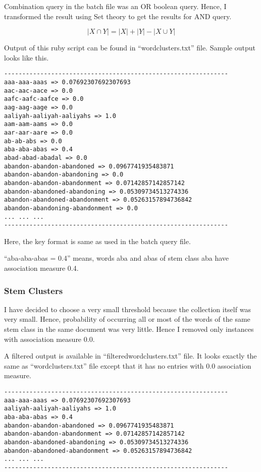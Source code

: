 \documentclass[letterpaper,12pt]{article}
\begin{document}
Combination query in the batch file was an OR boolean query. Hence, I transformed the result using Set theory to get the results for AND query.

$$ |X \cap Y| = |X| + |Y| - |X \cup Y| $$

Output of this ruby script can be found in ``wordclusters.txt'' file. Sample output looks like this.

\begin{verbatim}
--------------------------------------------------------------
aaa-aaa-aaas => 0.07692307692307693
aac-aac-aace => 0.0
aafc-aafc-aafce => 0.0
aag-aag-aage => 0.0
aaliyah-aaliyah-aaliyahs => 1.0
aam-aam-aams => 0.0
aar-aar-aare => 0.0
ab-ab-abs => 0.0
aba-aba-abas => 0.4
abad-abad-abadal => 0.0
abandon-abandon-abandoned => 0.0967741935483871
abandon-abandon-abandoning => 0.0
abandon-abandon-abandonment => 0.07142857142857142
abandon-abandoned-abandoning => 0.05309734513274336
abandon-abandoned-abandonment => 0.05263157894736842
abandon-abandoning-abandonment => 0.0
... ... ...
--------------------------------------------------------------
\end{verbatim}

Here, the key format is same as used in the batch query file.

``aba-aba-abas = 0.4'' means, words aba and abas of stem class aba have association measure 0.4.


\subsubsection{Stem Clusters}

I have decided to choose a very small threshold because the collection itself was very small. Hence, probability of occurring all or most of the words of the same stem class in the same document was very little. Hence I removed only instances with association measure 0.0.

A filtered output is available in ``filteredwordclusters.txt'' file. It looks exactly the same as ``wordclusters.txt'' file except that it has no entries with 0.0 association measure.

\begin{verbatim}
--------------------------------------------------------------
aaa-aaa-aaas => 0.07692307692307693
aaliyah-aaliyah-aaliyahs => 1.0
aba-aba-abas => 0.4
abandon-abandon-abandoned => 0.0967741935483871
abandon-abandon-abandonment => 0.07142857142857142
abandon-abandoned-abandoning => 0.05309734513274336
abandon-abandoned-abandonment => 0.05263157894736842
... ... ...
--------------------------------------------------------------
\end{verbatim}
\end{document}
